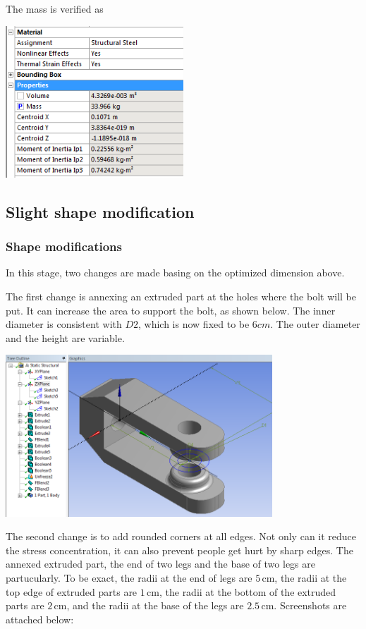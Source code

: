 \documentclass[a4paper,14pt]{extarticle}
\newcommand{\cm}{\,\si{\centi\meter}}
\begin{document}
The mass is verified as

\begin{center}\includegraphics[width=0.5\textwidth]{EX_4.PNG}\end{center}
\subsection{Slight shape modification}
\subsubsection{Shape modifications}
In this stage, two changes are made basing on the optimized dimension above.

The first change is annexing an extruded part at the holes where the bolt will be put. It can increase the area to support the bolt, as shown below. The inner diameter is consistent with $D2$, which is now fixed to be $6cm$. The outer diameter and the height are variable.

\begin{center}\includegraphics[width=0.75\textwidth]{NX/GEOMETRY.PNG}\end{center}

The second change is to add rounded corners at all edges. Not only can it reduce the stress concentration, it can also prevent people get hurt by sharp edges. The annexed extruded part, the end of two legs and the base of two legs are partucularly. To be exact, the radii at the end of legs are $5\cm$, the radii at the top edge of extruded parts are $1\cm$, the radii at the bottom of the extruded parts are $2\cm$, and the radii at the base of the legs are $2.5\cm$. Screenshots are attached below:
\end{document}
